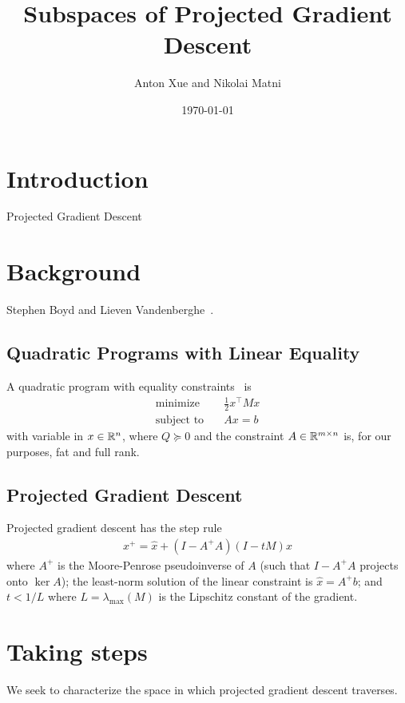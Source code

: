 \documentclass[12pt]{article}
\title{Subspaces of Projected Gradient Descent}
\author{Anton Xue and Nikolai Matni}
\date{\today}
\date{}
\begin{document}
\maketitle

\section{Introduction}
Projected Gradient Descent


\section{Background}
Stephen Boyd and Lieven Vandenberghe~\cite{boyd2004convex}.

\subsection{Quadratic Programs with Linear Equality}

A quadratic program with equality constraints~\cite{boyd2004convex} is
\begin{align}
  \text{minimize} &\quad \frac{1}{2} x^\top M x
    \label{eqn:qp} \\
  \text{subject to} &\quad Ax = b
\end{align}
with variable in \(x \in {\mathbb{R}}^n\),
where \(Q \succeq 0\) and the constraint \(A \in {\mathbb{R}}^{m \times n}\) is,
for our purposes, fat and full rank.

\subsection{Projected Gradient Descent}
Projected gradient descent has the step rule
\begin{align*}
  x^+ = \hat{x} + (I - A^+ A) (I - t M) x
\end{align*}
where \(A^+\) is the Moore-Penrose pseudoinverse of \(A\)
(such that \(I - A^+ A\) projects onto \(\ker A\));
the least-norm solution of the linear constraint is \(\hat{x} = A^+ b\);
and \(t < 1/L\) where \(L = \lambda_{\max} (M)\)
is the Lipschitz constant of the gradient.


\section{Taking steps}
We seek to characterize the space in which projected
gradient descent traverses.
\end{document}
